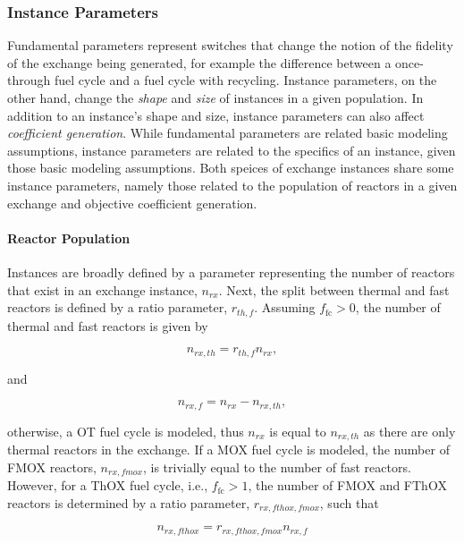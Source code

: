 \subsubsection{Instance Parameters}

Fundamental parameters represent switches that change the notion of the fidelity
of the exchange being generated, for example the difference between a
once-through fuel cycle and a fuel cycle with recycling. Instance parameters, on
the other hand, change the \textit{shape} and \textit{size} of instances in a
given population. In addition to an instance's shape and size, instance
parameters can also affect \textit{coefficient generation}. While fundamental
parameters are related basic modeling assumptions, instance parameters are
related to the specifics of an instance, given those basic modeling
assumptions. Both speices of exchange instances share some instance parameters,
namely those related to the population of reactors in a given exchange and
objective coefficient generation.

\paragraph{Reactor Population}

Instances are broadly defined by a parameter representing the number of reactors
that exist in an exchange instance, $n_{rx}$. Next, the split between thermal
and fast reactors is defined by a ratio parameter, $r_{th, f}$. Assuming
$f_{\text{fc}} > 0$, the number of thermal and fast reactors is given by

\begin{equation}
n_{rx, th} = r_{th, f} n_{rx},
\end{equation}

\noindent
and 

\begin{equation}
n_{rx, f} = n_{rx} - n_{rx, th},
\end{equation}

\noindent
otherwise, a OT fuel cycle is modeled, thus $n_{rx}$ is equal to $n_{rx, th}$ as
there are only thermal reactors in the exchange. If a MOX fuel cycle is modeled,
the number of FMOX reactors, $n_{rx, fmox}$, is trivially equal to the number of
fast reactors. However, for a ThOX fuel cycle, i.e., $f_{\text{fc}} > 1$, the
number of FMOX and FThOX reactors is determined by a ratio parameter, $r_{rx,
  fthox, fmox}$, such that

\begin{equation}
n_{rx, fthox} = r_{rx, fthox, fmox} n_{rx, f}
\end{equation}

